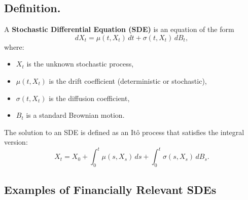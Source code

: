
\subsection{Definition.}  
A \textbf{Stochastic Differential Equation (SDE)} is an equation of the form
\[
dX_t = \mu(t, X_t) \, dt + \sigma(t, X_t) \, dB_t,
\]
where:
\begin{itemize}
    \item \( X_t \) is the unknown stochastic process,
    \item \( \mu(t, X_t) \) is the drift coefficient (deterministic or stochastic),
    \item \( \sigma(t, X_t) \) is the diffusion coefficient,
    \item \( B_t \) is a standard Brownian motion.
\end{itemize}

The solution to an SDE is defined as an Itô process that satisfies the integral version:
\[
X_t = X_0 + \int_0^t \mu(s, X_s) \, ds + \int_0^t \sigma(s, X_s) \, dB_s.
\]

\subsection{Examples of Financially Relevant SDEs}

